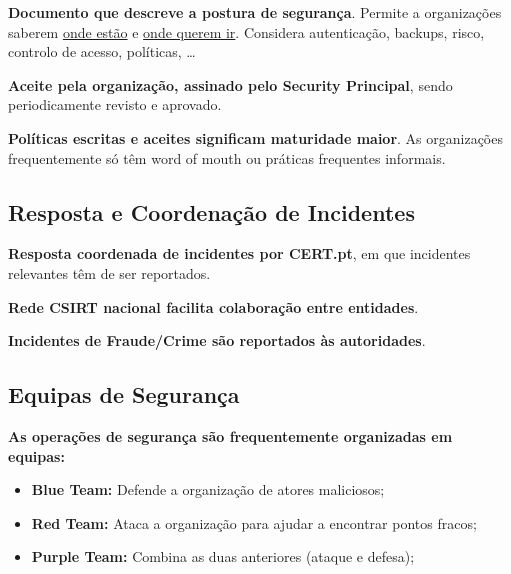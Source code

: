 \documentclass{article}
\begin{document}
\begin{flushleft}
  \textbf{Documento que descreve a postura de segurança}. Permite a organizações
  saberem \uline{onde estão} e \uline{onde querem ir}. Considera autenticação,
  backups, risco, controlo de acesso, políticas, \dots

  \vspace{2mm}

  \textbf{Aceite pela organização, assinado pelo Security Principal}, sendo periodicamente
  revisto e aprovado.

  \vspace{2mm}

  \textbf{Políticas escritas e aceites significam maturidade maior}. As organizações
  frequentemente só têm word of mouth ou práticas frequentes informais.
\end{flushleft}

\subsection{Resposta e Coordenação de Incidentes}

\begin{flushleft}
  \textbf{Resposta coordenada de incidentes por CERT.pt}, em que incidentes
  relevantes têm de ser reportados.

  \vspace{2mm}

  \textbf{Rede CSIRT nacional facilita colaboração entre entidades}.

  \vspace{2mm}

  \textbf{Incidentes de Fraude/Crime são reportados às autoridades}.
\end{flushleft}

\subsection{Equipas de Segurança}

\begin{flushleft}
  \textbf{As operações de segurança são frequentemente organizadas em equipas:}
  \begin{itemize}
    \item \textbf{Blue Team:} Defende a organização de atores maliciosos;
    \item \textbf{Red Team:} Ataca a organização para ajudar a encontrar pontos fracos;
    \item \textbf{Purple Team:} Combina as duas anteriores (ataque e defesa); 
  \end{itemize}
\end{flushleft}
\end{document}
